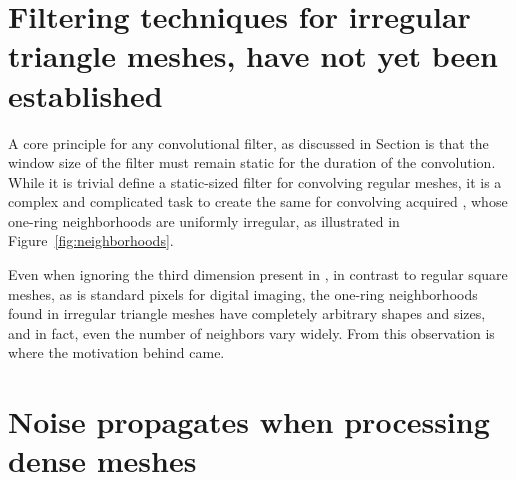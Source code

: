 \section{Filtering techniques for irregular triangle meshes, have not yet been established}



A core principle for any convolutional filter, as discussed in Section is that the  window size of the filter must remain static for the duration of the convolution. While it is trivial define a static-sized filter for convolving regular meshes, it is a complex and complicated task to create the same for convolving acquired \tdd{}, whose one-ring neighborhoods are uniformly irregular, as illustrated in Figure~\ref{fig:neighborhoods}.

Even when ignoring the third dimension present in \tdd{}, in contrast to regular square meshes, as is standard pixels for digital imaging, the one-ring neighborhoods found in irregular triangle meshes have completely arbitrary shapes and sizes, and in fact, even the number of neighbors vary widely. From this observation is where the motivation behind  came.
%
\section{Noise propagates when processing dense meshes}

%

%
